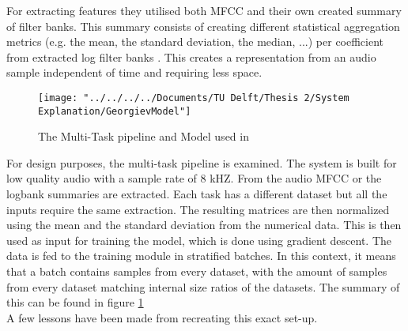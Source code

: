 For extracting features they utilised both MFCC \cite{pols1977spectral} and their own created summary of filter banks. This summary consists of creating different statistical aggregation metrics (e.g. the mean, the standard deviation, the median, ...) per coefficient from extracted log filter banks \cite{smith1987new}. This creates a representation from an audio sample independent of time and requiring less space.\\


\begin{figure}
	\centering
	\texttt{[image: "../../../../Documents/TU Delft/Thesis 2/System Explanation/GeorgievModel"]}
	\caption{The Multi-Task pipeline and Model used in \citet{georgiev2017low}}
	\label{fig:georgievmodel}
\end{figure}

For design purposes, the multi-task pipeline is examined. The system is built for low quality audio with a sample rate of 8 kHZ. From the audio MFCC or the logbank summaries are extracted. Each task has a different dataset but all the inputs require the same extraction. The resulting matrices are then normalized using the mean and the standard deviation from the numerical data. This is then used as input for training the model, which is done using gradient descent. The data is fed to the training module in stratified batches. In this context, it means that a batch contains samples from every dataset, with the amount of samples from every dataset matching internal size ratios of the datasets. The summary of this can be found in figure \ref{fig:georgievmodel} \\

A few lessons have been made from recreating this exact set-up. 


